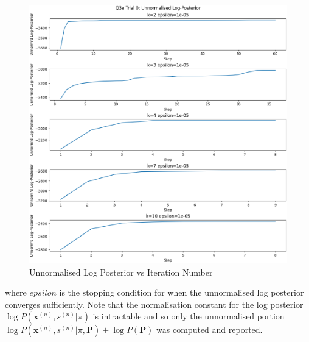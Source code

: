 \documentclass[12pt]{article}
\begin{document}
\begin{enumerate}
\begin{figure}[h]
\centering
\includegraphics[scale=0.35]{outputs/q3/q3e-0-log-pos}
\caption{Unnormalised Log Posterior vs Iteration Number}
\label{fig:3d-log-like}
\end{figure}

where $epsilon$ is the stopping condition for when the unnormalised log posterior converges sufficiently. Note that the normalisation constant for the log posterior $\log P(\textbf{x}^{(n)}, s^{(n)} | \pi)$ is intractable and so only the unnormalised portion $\log P( \textbf{x}^{(n)}, s^{(n)} | \pi, \mathbf{P} ) + \log P(\mathbf{P})$ was computed and reported.

\newpage


\end{enumerate}
\end{document}
